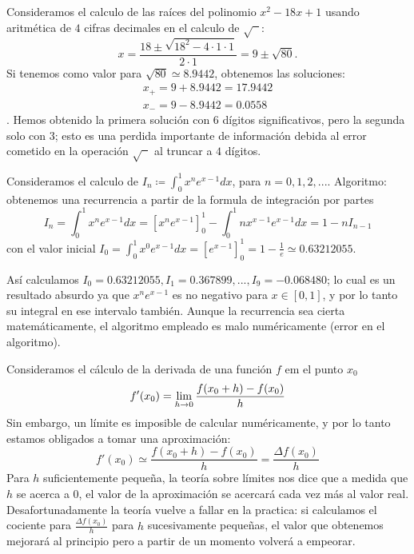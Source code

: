 \begin{example}\label{ej:2_errores}
    Consideramos el calculo de las raíces del polinomio $x^2 - 18x +1$ usando aritmética de $4$ cifras decimales en el calculo de $\sqrt{\phantom{x}}$:
    \[
            x = \dfrac{18 \pm \sqrt{18^2 - 4 \cdot 1 \cdot 1}}{2 \cdot 1} = 9 \pm \sqrt{80} \nonumber.
    \]
    Si tenemos como valor para $\sqrt{80} \simeq 8.9442$, obtenemos las soluciones:
    \begin{gather*}
            x_{+}=9+8.9442=17.9442 \\
            x_{-}=9-8.9442=0.0558
    \end{gather*}.
    Hemos obtenido la primera solución con $6$ dígitos significativos, pero la segunda solo con $3$; esto es una perdida importante de información debida al error cometido en la operación $\sqrt{\phantom{x}}$ al truncar a $4$ dígitos.
\end{example}

\begin{example}\label{ej:3_errores}
    Consideramos el calculo de $I_n \coloneqq \int_{0}^{1}x^ne^{x-1}dx$, para $n = 0,1,2,...$.
    Algoritmo: obtenemos una recurrencia a partir de la formula de integración por partes
    \[
            I_n = \int_{0}^{1}x^ne^{x-1}dx = [x^ne^{x-1}]_{0}^{1} - \int_{0}^{1}nx^{x-1}e^{x-1}dx = 1 - nI_{n-1} \nonumber
    \]
    con el valor inicial $I_0 = \int_{0}^{1}x^0e^{x-1}dx = [e^{x-1}]_{0}^{1} = 1 - \frac{1}{e} \simeq 0.63212055$.
    
    Así calculamos $I_0 = 0.63212055, I_1 = 0.367899, ..., I_9 = -0.068480$; lo cual es un resultado absurdo ya que $x^ne^{x-1}$ es no negativo para $x \in [0,1]$, y por lo tanto su integral en ese intervalo también. Aunque la recurrencia sea cierta matemáticamente, el algoritmo empleado es malo numéricamente (error en el algoritmo).
\end{example}

\begin{example}\label{ej:4_errores}
    Consideramos el cálculo de la derivada de una función $f$ em el punto $x_0$
    \[
            f'(x_0) = \lim\limits_{h \rightarrow 0} \dfrac{f(x_0 + h) - f(x_0)}{h} \nonumber
    \]
    Sin embargo, un límite es imposible de calcular numéricamente, y por lo tanto estamos obligados a tomar una aproximación:
    \[
            f'(x_0) \simeq \dfrac{f(x_0 + h) - f(x_0)}{h} = \frac{\Delta f(x_0)}{h} \nonumber
    \]
    Para $h$ suficientemente pequeña, la teoría sobre límites nos dice que a medida que $h$ se acerca a $0$, el valor de la aproximación se acercará cada vez más al valor real. Desafortunadamente la teoría vuelve a fallar en la practica: si calculamos el cociente para $\frac{\Delta f(x_0)}{h}$ para $h$ sucesivamente pequeñas, el valor que obtenemos mejorará al principio pero a partir de un momento volverá a empeorar. 
\end{example}
    
